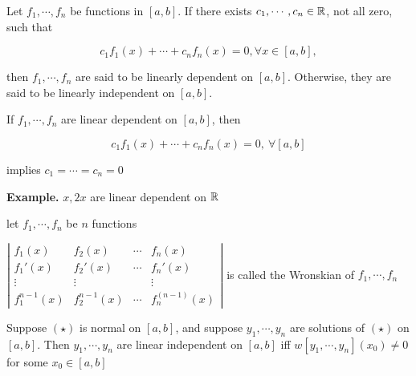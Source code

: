 \begin{defn}
	Let $f_1,\cdots,f_n$ be functions in $[a,b]$. If there exists $c_1,\cdots,c_n \in \mathbb{R}$, not all zero, such that
	
	$$c_1f_1(x) + \cdots + c_nf_n(x) = 0,\forall x \in [a,b],$$
	
	then $f_1,\cdots,f_n$ are said to be linearly dependent on $[a,b]$. Otherwise, they are said to be linearly independent on $[a,b]$.
\end{defn}

\begin{rmk*}
	If $f_1,\cdots,f_n$ are linear dependent on $[a,b]$, then
	
	$$c_1f_1(x) + \cdots + c_nf_n(x) = 0,~\forall[a,b]$$
	
	implies $c_1 = \cdots = c_n = 0$
\end{rmk*}

\textbf{Example.} $x,2x$ are linear dependent on $\mathbb{R}$

\begin{defn}
	let $f_1,\cdots , f_n$ be $n$ functions
	
	$\left|\begin{matrix}
		f_1(x) & f_2(x) & \cdots & f_n(x)\\
		f_1'(x) & f_2'(x) & \cdots & f_n'(x) \\
		\vdots & \vdots & & \vdots \\
		f_1^{n-1}(x) & f_2^{n-1}(x) & \cdots & f_n^{(n-1)}(x)
	\end{matrix}\right|$ is called the Wronskian of $f_1,\cdots,f_n$
\end{defn}

\begin{thm*}
	Suppose $(\star)$ is normal on $[a,b]$, and suppose $y_1,\cdots,y_n$ are solutions of $(\star)$ on $[a,b]$. Then $y_1,\cdots,y_n$ are linear independent on $[a,b]$ iff $w[y_1,\cdots,y_n](x_0)\neq 0$ for some $x_0 \in [a,b]$
\end{thm*}

